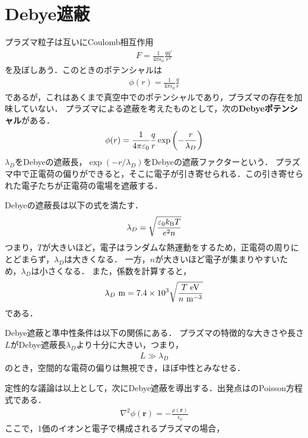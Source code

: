 \documentclass{report}
\begin{document}
  \section{Debye遮蔽}
    プラズマ粒子は互いにCoulomb相互作用
    \begin{align}
      F = \frac{1}{4\pi \epsilon_0}\frac{qq'}{r^2}
    \end{align}
    を及ぼしあう．このときのポテンシャルは
    \begin{align}
      \phi(r) = \frac{1}{4\pi \epsilon_0}\frac{q}{r}
    \end{align}
    であるが，これはあくまで真空中でのポテンシャルであり，プラズマの存在を加味していない．
    プラズマによる遮蔽を考えたものとして，次の\textbf{Debyeポテンシャル}がある．
    \begin{align}
      \phi(r) = \frac{1}{4\pi\varepsilon_0}\frac{q}{r}\exp\qty(-\frac{r}{\lambda_D})
    \end{align}
    $\lambda_D$をDebyeの遮蔽長，$\exp(-r/\lambda_D)$をDebyeの遮蔽ファクターという．
    プラズマ中で正電荷の偏りができると，そこに電子が引き寄せられる．この引き寄せられた電子たちが正電荷の電場を遮蔽する．
    \par
    Debyeの遮蔽長は以下の式を満たす．
    \begin{align}
      \lambda_D = \sqrt{\frac{\varepsilon_0 k_{\mathrm{B}} T}{e^2 n}}
    \end{align}
    つまり，$T$が大きいほど，電子はランダムな熱運動をするため，正電荷の周りにとどまらず，$\lambda_D$は大きくなる．
    一方，$n$が大きいほど電子が集まりやすいため，$\lambda_D$は小さくなる．
    また，係数を計算すると，
    \begin{align}
      \lambda_D \ \r{m} = 7.4\times 10^3\sqrt{\frac{T\ \r{eV}}{n\ \r{m^{-3}}}}
    \end{align}
    である．
    \par
    Debye遮蔽と準中性条件は以下の関係にある．
    プラズマの特徴的な大きさや長さ$L$がDebye遮蔽長$\lambda_D$より十分に大きい，つまり，
    \begin{align}
      L \gg \lambda_D
    \end{align}
    のとき，空間的な電荷の偏りは無視でき，ほぼ中性とみなせる．
    \par
    定性的な議論は以上として，次にDebye遮蔽を導出する．出発点はのPoisson方程式である．
    \begin{align}
      \nabla^2 \phi(\bm{r}) = -\frac{\rho(\bm{r})}{\epsilon_0} \label{poisson-eq}
    \end{align}
    ここで，1価のイオンと電子で構成されるプラズマの場合，
\end{document}
